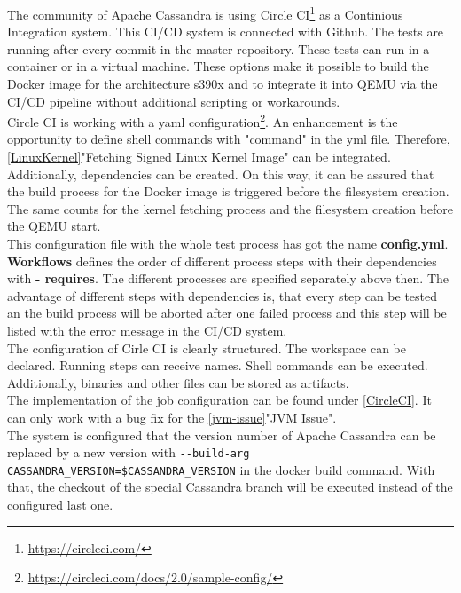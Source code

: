 The community of Apache Cassandra is using Circle CI\footnote{\url{https://circleci.com/}} as a Continious Integration system.
This CI/CD system is connected with Github. The tests are running after every commit in the master repository.
These tests can run in a container or in a virtual machine. These options make it possible to build the Docker image for the architecture s390x and to integrate it into QEMU via the CI/CD pipeline without additional scripting or workarounds. \\
Circle CI is working with a yaml configuration\footnote{\url{https://circleci.com/docs/2.0/sample-config/}}. 
An enhancement is the opportunity to define shell commands with "command" in the yml file. Therefore, \ref{LinuxKernel}"Fetching Signed Linux Kernel Image" can be integrated. 
Additionally, dependencies can be created. On this way, it can be assured that the build process for the Docker image is triggered before the filesystem creation. 
The same counts for the kernel fetching process and the filesystem creation before the QEMU start. \\
This configuration file with the whole test process has got the name \textbf{config.yml}. \\
\textbf{Workflows} defines the order of different process steps with their dependencies with \textbf{- requires}.
The different processes are specified separately above then. 
The advantage of different steps with dependencies is, that every step can be tested an the build process will be aborted after one failed process and this step will be listed with the error message in the CI/CD system. \\
The configuration of Cirle CI is clearly structured. The workspace can be declared. Running steps can receive names. Shell commands can be executed. Additionally, binaries and other files can be stored as artifacts. \\
The implementation of the job configuration can be found under \ref{CircleCI}. It can only work with a bug fix for the \ref{jvm-issue}"JVM Issue".\\
The system is configured that the version number of Apache Cassandra can be replaced by a new version with \verb+--build-arg CASSANDRA_VERSION=$CASSANDRA_VERSION+ in the docker build command. With that, the checkout of the special Cassandra branch will be executed instead of the configured last one.

